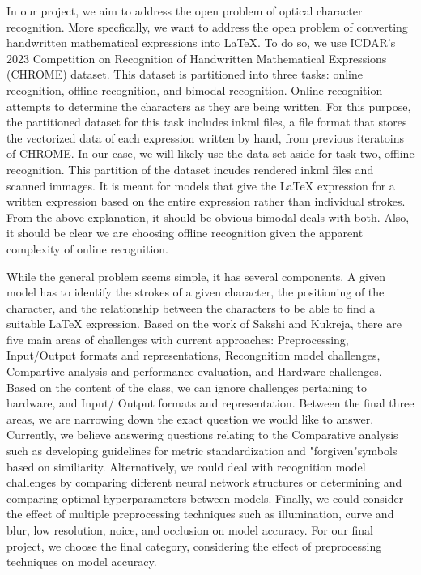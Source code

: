 \documentclass[../proposal.tex]{subfiles}
\begin{document}
\indent In our project, we aim to address the open problem of optical character recognition. More specfically, we want to address the open problem of converting handwritten mathematical expressions into LaTeX. To do so, we use ICDAR's 2023 Competition on Recognition of Handwritten Mathematical Expressions (CHROME) dataset. This dataset is partitioned into three tasks: online recognition, offline recognition, and bimodal recognition. Online recognition attempts to determine the characters as they are being written. For this purpose, the partitioned dataset for this task includes inkml files, a file format that stores the vectorized data of each expression written by hand, from previous iteratoins of CHROME\@.\cite{Xie_2023_CROHME} In our case, we will likely use the data set aside for task two, offline recognition. This partition of the dataset incudes rendered inkml files and scanned immages. It is meant for models that give the LaTeX expression for a written expression based on the entire expression rather than individual strokes. From the above explanation, it should be obvious bimodal deals with both. Also, it should be clear we are choosing offline recognition given the apparent complexity of online recognition.

\indent While the general problem seems simple, it has several components. A given model has to identify the strokes of a given character, the positioning of the character, and the relationship between the characters to be able to find a suitable LaTeX expression. Based on the work of Sakshi and Kukreja, there are five main areas of challenges with current approaches: Preprocessing, Input/Output formats and representations, Recongnition model challenges, Compartive analysis and performance evaluation, and Hardware challenges. \cite{Sakshi_2023_whiteGrey} Based on the content of the class, we can ignore challenges pertaining to hardware, and Input/ Output formats and representation. Between the final three areas, we are narrowing down the exact question we would like to answer. Currently, we believe answering questions relating to the Comparative analysis such as developing guidelines for metric standardization and "forgiven"symbols based on similiarity. Alternatively, we could deal with recognition model challenges by comparing different neural network structures or determining and comparing optimal hyperparameters between models. Finally, we could consider the effect of multiple preprocessing techniques such as illumination, curve and blur, low resolution, noice, and occlusion on model accuracy. For our final project, we choose the final category, considering the effect of preprocessing techniques on model accuracy.
\end{document}
